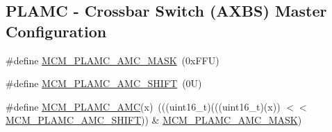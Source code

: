 \subsection*{P\+L\+A\+MC -\/ Crossbar Switch (A\+X\+BS) Master Configuration}
\begin{DoxyCompactItemize}
\item 
\#define \mbox{\hyperlink{group___m_c_m___register___masks_ga7988227df54012705c7f522f348214ee}{M\+C\+M\+\_\+\+P\+L\+A\+M\+C\+\_\+\+A\+M\+C\+\_\+\+M\+A\+SK}}~(0x\+F\+F\+U)
\item 
\#define \mbox{\hyperlink{group___m_c_m___register___masks_gaa1b3153d0bf749f80fffacd948dd4bd4}{M\+C\+M\+\_\+\+P\+L\+A\+M\+C\+\_\+\+A\+M\+C\+\_\+\+S\+H\+I\+FT}}~(0\+U)
\item 
\#define \mbox{\hyperlink{group___m_c_m___register___masks_gad8199ccd7b6edb29bcd5e940d17e7e47}{M\+C\+M\+\_\+\+P\+L\+A\+M\+C\+\_\+\+A\+MC}}(x)~(((uint16\+\_\+t)(((uint16\+\_\+t)(x)) $<$$<$ \mbox{\hyperlink{group___m_c_m___register___masks_gaa1b3153d0bf749f80fffacd948dd4bd4}{M\+C\+M\+\_\+\+P\+L\+A\+M\+C\+\_\+\+A\+M\+C\+\_\+\+S\+H\+I\+FT}})) \& \mbox{\hyperlink{group___m_c_m___register___masks_ga7988227df54012705c7f522f348214ee}{M\+C\+M\+\_\+\+P\+L\+A\+M\+C\+\_\+\+A\+M\+C\+\_\+\+M\+A\+SK}})
\end{DoxyCompactItemize}
